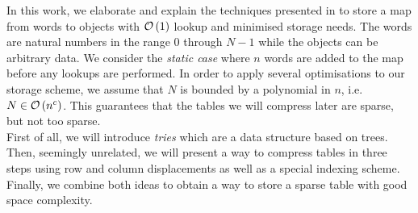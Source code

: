 In this work, we elaborate and explain the techniques presented in \cite{tarjan:storing_sparse_table} to store a map from words to objects with $\mathcal{O}\left(1\right)$ lookup and minimised storage needs.
The words are natural numbers in the range $0$ through $N-1$ while the objects can be arbitrary data.
We consider the \emph{static case} where $n$ words are added to the map before any lookups are performed.
In order to apply several optimisations to our storage scheme, we assume that $N$ is bounded by a polynomial in $n$, i.e.~$N \in \mathcal{O}\left(n^c\right)$.
This guarantees that the tables we will compress later are sparse, but not too sparse. \\
First of all, we will introduce \emph{tries} which are a data structure based on trees.
Then, seemingly unrelated, we will present a way to compress tables in three steps using row and column displacements as well as a special indexing scheme.
Finally, we combine both ideas to obtain a way to store a sparse table with good space complexity.